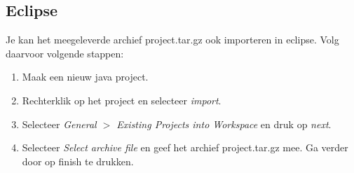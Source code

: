 \documentclass{article}
\begin{document}
\subsection{Eclipse}
\label{sub:eclipse}
Je kan het meegeleverde archief project.tar.gz ook importeren in eclipse. Volg daarvoor volgende stappen:
\begin{enumerate}
	\item Maak een nieuw java project.
	\item Rechterklik op het project en selecteer \emph{import}.
	\item Selecteer \emph{General $>$ Existing Projects into Workspace} en druk op \emph{next}.
	\item Selecteer \emph{Select archive file} en geef het archief project.tar.gz mee. Ga verder door op finish te drukken.
\end{enumerate}
\end{document}
